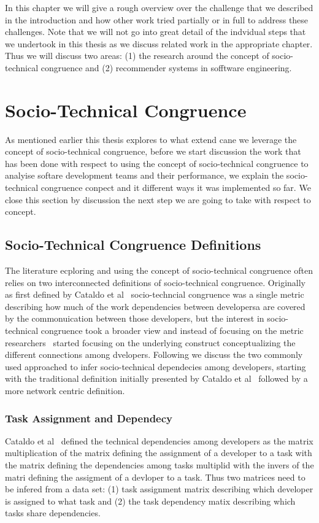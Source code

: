 In this chapter we will give a rough overview over the challenge that we described in the introduction and how other work tried partially or in full to address these challenges.
Note that we will not go into great detail of the indvidual steps that we undertook in this thesis as we discuss related work in the appropriate chapter.
Thus we will discuss two areas: (1) the research around the concept of socio-technical congruence and (2) recommender systems in sofftware engineering.

\section{Socio-Technical Congruence}
As mentioned earlier this thesis explores to what extend cane we leverage the concept of socio-technical congruence, before we start discussion the work that has been done with respect to using the concept of socio-technical congruence to analyise softare development teams and their performance, we explain the socio-technical congruence conpect and it different ways it was implemented so far.
We close this section by discussion the next step we are going to take with respect to concept.

\subsection{Socio-Technical Congruence Definitions}
The literature ecploring and using the concept of socio-technical congruence often relies on two interconnected definitions of socio-technical congruence.
Originally as first defined by Cataldo et al~\cite{cataldo:cscw:2006} socio-techncial congruence was a single metric describing how much of the work dependencies between developersa are covered by the commonuication between those developers, but the interest in socio-technical congruence took a broader view and instead of focusing on the metric researchers~\cite{} started focusing on the underlying construct conceptualizing the different connections among dvelopers.
Following we discuss the two commonly used approached to infer socio-technical dependecies among developers, starting with the traditional definition initially presented by Cataldo et al~\cite{cataldo:cscw:2006} followed by a more network centric definition.

\subsubsection{Task Assignment and Dependecy}
Cataldo et al~\cite{cataldo:cscw:2006} defined the technical dependencies among developers as the matrix multiplication of the matrix defining the assignment of a developer to a task with the matrix defining the dependencies among tasks multiplid with the invers of the matri defining the assigment of a devloper to a task.
Thus two matrices need to be infered from a data set: (1) task assignment matrix describing which developer is assigned to what task and (2) the task dependency matix describing which tasks share dependencies.

